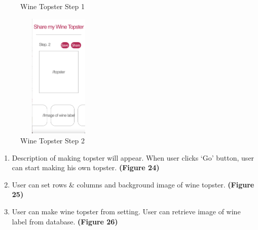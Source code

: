 \documentclass[sigconf, nonacm]{acmart}
\begin{document}
\begin{enumerate}
\begin{figure}
  \caption{Wine Topster Step 1}
  \label{fig:wine topster 1}
\end{figure}
\begin{figure}
  \centering
  \includegraphics[width=4cm, height=6cm]{top2.png}
  \caption{Wine Topster Step 2}
  \label{fig:wine topster 2}
\end{figure}
\begin{enumerate}
    \item Description of making topster will
appear. When user clicks ‘Go’ button,
user can start making his own topster. \textbf{(Figure 24)}
\item User can set rows \& columns and
background image of wine topster.
\textbf{(Figure 25)}
\item User can make wine topster from setting. User
can retrieve image of wine label from database. \textbf{(Figure 26)}
\end{enumerate}
   

\end{enumerate}
\end{document}
